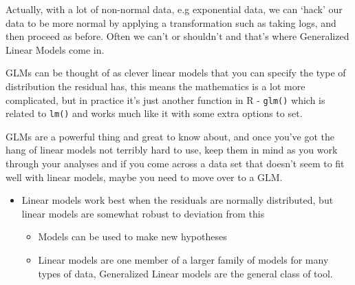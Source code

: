 \documentclass[
]{book}
\providecommand{\tightlist}{%
  \setlength{\itemsep}{0pt}\setlength{\parskip}{0pt}}
\newenvironment{sidenote}
{ \begin{tcolorbox}[colbacktitle=blue!50!white,
title=huh?,coltitle=white,
fonttitle=\bfseries] }
{  \end{tcolorbox} }
\newenvironment{roundup}
{ \begin{tcolorbox}[colbacktitle=yellow!50!white,
title=Round Up,coltitle=black,
fonttitle=\bfseries] }
{  \end{tcolorbox} }
\begin{document}
\begin{sidenote}
Actually, with a lot of non-normal data, e.g exponential data, we can `hack' our data to be more normal by applying a transformation such as taking logs, and then proceed as before. Often we can't or shouldn't and that's where Generalized Linear Models come in.
\end{sidenote}

GLMs can be thought of as clever linear models that you can specify the type of distribution the residual has, this means the mathematics is a lot more complicated, but in practice it's just another function in R - \texttt{glm()} which is related to \texttt{lm()} and works much like it with some extra options to set.

GLMs are a powerful thing and great to know about, and once you've got the hang of linear models not terribly hard to use, keep them in mind as you work through your analyses and if you come across a data set that doesn't seem to fit well with linear models, maybe you need to move over to a GLM.

\begin{roundup}
\begin{itemize}
\tightlist
\item
  Linear models work best when the residuals are normally distributed, but linear models are somewhat robust to deviation from this

  \begin{itemize}
  \tightlist
  \item
    Models can be used to make new hypotheses
  \item
    Linear models are one member of a larger family of models for many types of data, Generalized Linear models are the general class of tool.
  \end{itemize}
\end{itemize}
\end{roundup}

  
\end{document}

